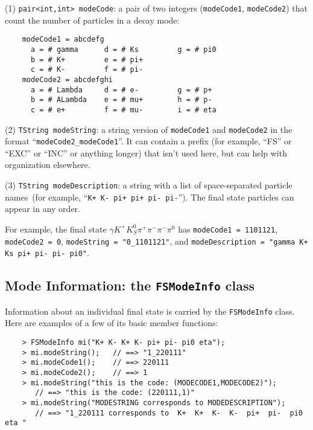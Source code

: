 \documentclass[11pt]{article}
\begin{document}
(1) {\tt pair<int,int> modeCode}: a pair of two integers ({\tt modeCode1}, {\tt modeCode2}) that count the number of particles in a decay mode:
\begin{verbatim}
    modeCode1 = abcdefg
      a = # gamma      d = # Ks         g = # pi0
      b = # K+         e = # pi+
      c = # K-         f = # pi-
    modeCode2 = abcdefghi
      a = # Lambda     d = # e-         g = # p+
      b = # ALambda    e = # mu+        h = # p-
      c = # e+         f = # mu-        i = # eta
\end{verbatim}
(2) {\tt TString modeString}: a string version of {\tt modeCode1} and {\tt modeCode2} in the format ``{\tt modeCode2\_modeCode1}''.  It can contain a prefix (for example, ``FS'' or ``EXC'' or ``INC'' or anything longer) that isn't used here, but can help with organization elsewhere.  

(3) {\tt TString modeDescription}: a string with a list of space-separated particle names~(for example, ``{\tt K+ K- pi+ pi+ pi- pi-}'').  The final state particles can appear in any order. 

For example, the final state $\gamma K^+ K^0_S \pi^+ \pi^- \pi^- \pi^0$ has {\tt modeCode1 = 1101121}, {\tt modeCode2 = 0}, {\tt modeString = "0\_1101121"}, and {\tt modeDescription = "gamma K+ Ks pi+ pi- pi- pi0"}. 

\subsection{Mode Information: the {\tt FSModeInfo} class}
\label{sec:modeinfo}

Information about an individual final state is carried by the {\tt FSModeInfo} class.  Here are examples of a few of its basic member functions:
\begin{verbatim}
    > FSModeInfo mi("K+ K- K+ K- pi+ pi- pi0 eta");
    > mi.modeString();   // ==> "1_220111"
    > mi.modeCode1();    // ==> 220111
    > mi.modeCode2();    // ==> 1
    > mi.modeString("this is the code: (MODECODE1,MODECODE2)");
       // ==> "this is the code: (220111,1)" 
    > mi.modeString("MODESTRING corresponds to MODEDESCRIPTION");
       // ==> "1_220111 corresponds to  K+  K+  K-  K-  pi+  pi-  pi0  eta "
\end{verbatim}
\end{document}
